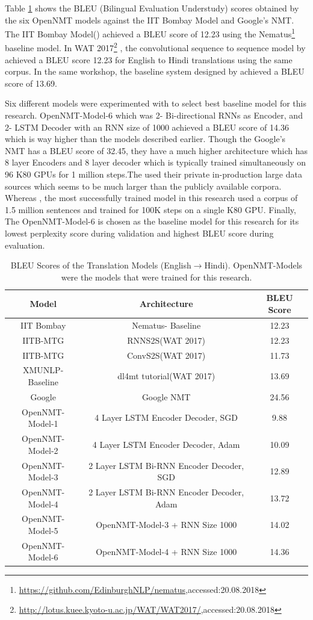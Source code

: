 Table \ref{bleutable1} shows the BLEU (Bilingual Evaluation Understudy) scores obtained by the six OpenNMT models against the IIT Bombay Model and Google's NMT. The IIT Bombay Model(\cite{Kunchukuttan2018TheIB}) achieved a BLEU score of 12.23 using the Nematus\footnote{{\url{https://github.com/EdinburghNLP/nematus},accessed:20.08.2018}} baseline model. In WAT 2017\footnote{{\url{http://lotus.kuee.kyoto-u.ac.jp/WAT/WAT2017/},accessed:20.08.2018}} , the convolutional sequence to sequence model by  \cite{Singh2017ComparingRA} achieved a BLEU score 12.23 for English to Hindi translations using the same corpus. In the same workshop, the baseline system designed by \cite{W17-5707} achieved a BLEU score of 13.69. 

Six different models were experimented with to select best baseline model for this research. OpenNMT-Model-6 which was 2- Bi-directional RNNs as Encoder, and 2- LSTM Decoder with an RNN size of 1000 achieved a BLEU score of 14.36 which is way higher than the models described earlier.  Though the Google's NMT has a BLEU score of 32.45, they have a much higher architecture which has 8 layer Encoders and 8 layer decoder which is typically trained simultaneously on 96 K80 GPUs for 1 million steps.The used their private in-production large data sources which seems to be much larger than the publicly available corpora. Whereas , the most successfully trained model in this research used a corpus of 1.5 million sentences and trained for 100K steps on a single K80 GPU. Finally, The OpenNMT-Model-6 is chosen as the baseline model for this research for its lowest perplexity score during validation and highest BLEU score during evaluation.

\begin{table}[h]
\centering
 \begin{tabular}{ |c|c|c| } 
  \hline Model & Architecture & BLEU Score  \\ 
  \hline  IIT Bombay & Nematus- Baseline & 12.23\\
  \hline  IITB-MTG &  RNNS2S(WAT 2017) & 12.23\\
  IITB-MTG & ConvS2S(WAT 2017) & 11.73\\
   XMUNLP-Baseline &  dl4mt tutorial(WAT 2017) & 13.69\\
  \hline  Google & Google NMT & 24.56\\
  \hline  OpenNMT-Model-1 &  4 Layer LSTM Encoder Decoder, SGD & 9.88\\
  OpenNMT-Model-2 & 4 Layer LSTM Encoder Decoder, Adam & 10.09\\
  OpenNMT-Model-3 & 2 Layer LSTM Bi-RNN Encoder Decoder, SGD & 12.89 \\
  OpenNMT-Model-4 & 2 Layer LSTM Bi-RNN Encoder Decoder, Adam & 13.72 \\
  OpenNMT-Model-5 & OpenNMT-Model-3 + RNN Size 1000 & 14.02 \\
  OpenNMT-Model-6 & OpenNMT-Model-4 + RNN Size 1000 & 14.36 \\
  \hline
 \end{tabular}
\caption{BLEU Scores of the Translation Models (English$\rightarrow$Hindi). OpenNMT-Models were the models that were trained for this research.}
\label{bleutable1}
\end{table}

